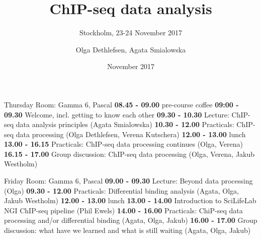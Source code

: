 \documentclass{beamer}\usepackage[]{graphicx}\usepackage[]{color}
\title[ChIP-seq]{ChIP-seq data analysis}
\subtitle{Stockholm, 23-24 November 2017}
\author[Olga]{Olga Dethlefsen, Agata Smialowska}
\institute[NBIS]{NBIS, National Bioinformatics Infrastructure Sweden\\}
\date[November 2017]{November 2017}
\begin{document}
\begin{frame}
\date{}
\titlepage
\end{frame}

\logo{}

\begin{frame}
\begin{block}{Thursday}
\scriptsize
\vspace{4mm}
Room: Gamma 6, Pascal \newline \newline
\textbf{08.45 - 09.00} pre-course coffee \newline \newline
\textbf{09:00 - 09.30} Welcome, incl. getting to know each other \newline \newline
\textbf{09.30 - 10.30} Lecture: ChIP-seq data analysis principles (Agata Smialowska) \newline \newline
\textbf{10.30 - 12.00} Practicals: ChIP-seq data processing (Olga Dethlefsen, Verena Kutschera) \newline \newline
\textbf{12.00 - 13.00} lunch \newline \newline
\textbf{13.00 - 16.15} Practicals: ChIP-seq data processing continues (Olga, Verena) \newline \newline
\textbf{16.15 - 17.00} Group discussion: ChIP-seq data processing (Olga, Verena, Jakub Westholm) \newline \newline
\end{block}
\end{frame}

\begin{frame}
\begin{block}{Friday}
\scriptsize
\vspace{4mm}
Room: Gamma 6, Pascal \newline \newline
\textbf{09.00 - 09.30} Lecture: Beyond data processing (Olga) \newline \newline
\textbf{09.30 - 12.00} Practicals: Differential binding analysis (Agata, Olga, Jakub Westholm) \newline \newline
\textbf{12.00 - 13.00} lunch \newline \newline
\textbf{13.00 - 14.00} Introduction to SciLifeLab NGI ChIP-seq pipeline (Phil Ewels) \newline \newline
\textbf{14.00 - 16.00} Practicals: ChiP-seq data processing and/or differential binding (Agata, Olga, Jakub) \newline \newline
\textbf{16.00 - 17.00} Group discussion: what have we learned and what is still waiting (Agata, Olga, Jakub) \newline \newline
\end{block}
\end{frame}
\end{document}

